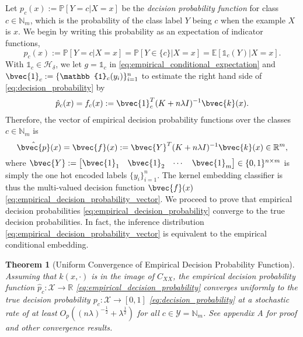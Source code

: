 \documentclass{article}
\newtheorem{theorem}{Theorem}[section]
\begin{document}
	Let $p_{c}(x) := \mathbb{P}[Y = c | X = x]$ be the \textit{decision probability function} for class $c \in \mathbb{N}_{m}$, which is the probability of the class label $Y$ being $c$ when the example $X$ is $x$. We begin by writing this probability as an expectation of indicator functions,
	\begin{equation}
		p_{c}(x) := \mathbb{P}[Y = c | X = x] = \mathbb{P}[Y \in \{c\} | X = x] = \mathbb{E}[\mathbb{1}_{c}(Y) | X = x].
	\label{eq:decision_probability}
	\end{equation}	
	With $\mathbb{1}_{c} \in \mathcal{H}_{\delta}$, we let $g = \mathbb{1}_{c}$ in \eqref{eq:empirical_conditional_expectation} and $\bvec{1}_{c} := \{\mathbb{1}_{c}(y_{i})\}_{i = 1}^{n}$ to estimate the right hand side of \eqref{eq:decision_probability} by
	\begin{equation}
		\hat{p}_{c}(x) = f_{c}(x) := \bvec{1}_{c}^{T} (K + n \lambda I)^{-1} \bvec{k}(x).
	\label{eq:empirical_decision_probability}
	\end{equation}
	Therefore, the vector of empirical decision probability functions over the classes $c \in \mathbb{N}_{m}$ is
	\begin{equation}
		\hat{\bvec{p}}(x) = \bvec{f}(x) := \bvec{Y}^{T} (K + n \lambda I)^{-1} \bvec{k}(x) \in \mathbb{R}^{m},
	\label{eq:empirical_decision_probability_vector}
	\end{equation}
	where $\bvec{Y} := \begin{bmatrix} \bvec{1}_{1} & \bvec{1}_{2} & \cdots & \bvec{1}_{m} \end{bmatrix} \in \{0, 1\}^{n \times m}$ is simply the one hot encoded labels $\{y_{i}\}_{i = 1}^{n}$. The kernel embedding classifier is thus the multi-valued decision function $\bvec{f}(x)$ \eqref{eq:empirical_decision_probability_vector}. We proceed to prove that empirical decision probabilities \eqref{eq:empirical_decision_probability} converge to the true decision probabilities. In fact, the inference distribution \eqref{eq:empirical_decision_probability_vector} is equivalent to the empirical conditional embedding.
	\begin{theorem}[Uniform Convergence of Empirical Decision Probability Function]
		\label{thm:probability_convergence_copy}
		Assuming that $k(x, \cdot)$ is in the image of $C_{XX}$, the empirical decision probability function $\hat{p}_{c} : \mathcal{X} \to \mathbb{R}$ \eqref{eq:empirical_decision_probability} converges uniformly to the true decision probability $p_{c} : \mathcal{X} \to [0, 1]$ \eqref{eq:decision_probability} at a stochastic rate of at least $O_{p}((n \lambda)^{-\frac{1}{2}} + \lambda^{\frac{1}{2}})$ for all $c \in \mathcal{Y} = \mathbb{N}_{m}$. See appendix A for proof and other convergence results.
	\end{theorem}
\end{document}
